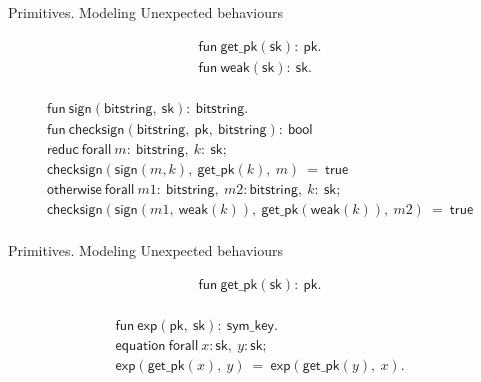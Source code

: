 \documentclass{beamer}
\begin{document}
\begin{frame}{Primitives. Modeling Unexpected behaviours}
  \begin{fleqn}[\parindent]
    \begin{equation*}\begin{array}{l}
        \mathsf{fun}\ \mathsf{get\_pk}(\mathsf{sk}):\ \mathsf{pk}. \\
        \mathsf{fun}\ \mathsf{weak}(\mathsf{sk}):\ \mathsf{sk}. \\
    \end{array}\end{equation*}
  \end{fleqn}
  \begin{fleqn}[\parindent]
    \begin{equation*}\begin{array}{l}
        \mathsf{fun}\ \mathsf{sign}(\mathsf{bitstring},\ \mathsf{sk}):\ \mathsf{bitstring}. \\
        \mathsf{fun}\ \mathsf{checksign}(\mathsf{bitstring},\ \mathsf{pk},\ \mathsf{bitstring}):\ \mathsf{bool} \\
        \mathsf{reduc}\ \mathsf{forall}\ m:\ \mathsf{bitstring},\ k:\ \mathsf{sk}; \\ \mathsf{checksign}(\mathsf{sign}(m,k),\ \mathsf{get\_pk}(k),\ m)\ =\ \mathsf{true} \\
        \mathsf{otherwise}\ \mathsf{forall}\ m1:\ \mathsf{bitstring},\ m2:\mathsf{bitstring},\ k: \ \mathsf{sk};\\
        \mathsf{checksign}(\mathsf{sign}(m1,\ \mathsf{weak}(k)),\ \mathsf{get\_pk}(\mathsf{weak}(k)),\ m2)\ =\ \mathsf{true}\\
    \end{array}\end{equation*}
  \end{fleqn}
\end{frame}

\begin{frame}{Primitives. Modeling Unexpected behaviours}
  \begin{fleqn}[\parindent]
    \begin{equation*}\begin{array}{l}
        \mathsf{fun}\ \mathsf{get\_pk}(\mathsf{sk}):\ \mathsf{pk}. \\
    \end{array}\end{equation*}
  \end{fleqn}
  \begin{fleqn}[\parindent]
    \begin{equation*}\begin{array}{l}
        \mathsf{fun}\ \mathsf{exp}(\mathsf{pk},\ \mathsf{sk}):\ \mathsf{sym\_key}.\\
        \mathsf{equation}\ \mathsf{forall}\ x:\mathsf{sk},\ y:\mathsf{sk};\\ \mathsf{exp}(\mathsf{get\_pk}(x),\ y)\ =\ \mathsf{exp}(\mathsf{get\_pk}(y),\ x).\\
    \end{array}\end{equation*}
  \end{fleqn}
\end{frame}
\end{document}
